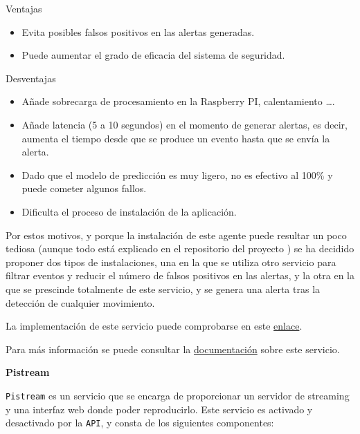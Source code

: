 Ventajas

\begin{itemize}

\vspace{-0.5cm}

\item Evita posibles falsos positivos en las alertas generadas.
\item Puede aumentar el grado de eficacia del sistema de seguridad.
\end{itemize}

Desventajas

\vspace{-0.5cm}

\begin{itemize}
\item Añade sobrecarga de procesamiento en la Raspberry PI, calentamiento \ldots.
\item Añade latencia (5 a 10 segundos) en el momento de generar alertas, es decir, aumenta el tiempo desde que se produce un evento hasta que se envía la alerta.
\item Dado que el modelo de predicción es muy ligero, no es efectivo al 100\% y puede cometer algunos fallos.
\item Dificulta el proceso de instalación de la aplicación.
\end{itemize}

Por estos motivos, y porque la instalación de este agente puede resultar un poco tediosa (aunque todo está explicado en el repositorio del proyecto \cite{ref1}) se ha decidido proponer dos tipos de instalaciones, una en la que se utiliza otro servicio para filtrar eventos y reducir el número de falsos positivos en las alertas, y la otra en la que se prescinde totalmente de este servicio, y se genera una alerta tras la detección de cualquier movimiento.

La implementación de este servicio puede comprobarse en este \href{https://github.com/jmv74211/TFM_security_system_PI/blob/master/src/agents/object_detector_agent.py}{enlace}.

Para más información se puede consultar la \href{https://github.com/jmv74211/TFM_security_system_PI/blob/master/doc/api/object_detector_agent_doc.md}{documentación} sobre este servicio.

\textbf{Pistream}

\texttt{Pistream} es un servicio que se encarga de proporcionar un servidor de streaming y una interfaz web donde poder reproducirlo. Este servicio es activado y desactivado por la \texttt{API}, y consta de los siguientes componentes:

